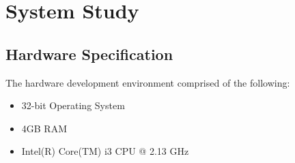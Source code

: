 \documentclass[12pt]{article}
\begin{document}
\section{System Study}
\label{sec:system}
 
\subsection{Hardware Specification}
The hardware development environment comprised of the following:
\begin{itemize}
    \item 32-bit Operating System 
\item 4GB RAM 
\item Intel(R) Core(TM) i3 CPU @ 2.13 GHz
\end{itemize}
\end{document}
